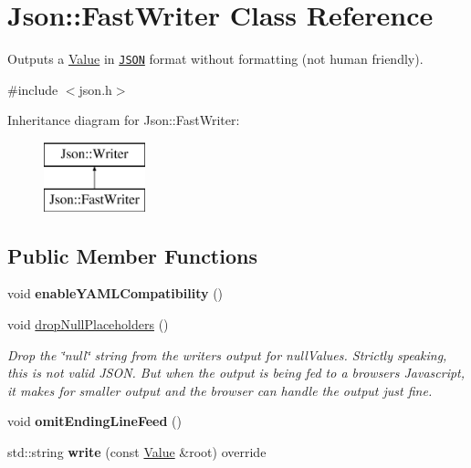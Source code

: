 \hypertarget{class_json_1_1_fast_writer}{}\section{Json\+:\+:Fast\+Writer Class Reference}
\label{class_json_1_1_fast_writer}


Outputs a \hyperlink{class_json_1_1_value}{Value} in \href{http://www.json.org}{\tt J\+S\+O\+N} format without formatting (not human friendly).  




{\ttfamily \#include $<$json.\+h$>$}

Inheritance diagram for Json\+:\+:Fast\+Writer\+:\begin{figure}[H]
\begin{center}
\leavevmode
\includegraphics[height=2.000000cm]{class_json_1_1_fast_writer}
\end{center}
\end{figure}
\subsection*{Public Member Functions}
\begin{DoxyCompactItemize}
\item 
\hypertarget{class_json_1_1_fast_writer_a78d98e9f76d33660ad6e6a1abe287d45}{}void {\bfseries enable\+Y\+A\+M\+L\+Compatibility} ()\label{class_json_1_1_fast_writer_a78d98e9f76d33660ad6e6a1abe287d45}

\item 
\hypertarget{class_json_1_1_fast_writer_a6e93d8dce951e408517311026a065b40}{}void \hyperlink{class_json_1_1_fast_writer_a6e93d8dce951e408517311026a065b40}{drop\+Null\+Placeholders} ()\label{class_json_1_1_fast_writer_a6e93d8dce951e408517311026a065b40}

\begin{DoxyCompactList}\small\item\em Drop the \char`\"{}null\char`\"{} string from the writer\textquotesingle{}s output for null\+Values. Strictly speaking, this is not valid J\+S\+O\+N. But when the output is being fed to a browser\textquotesingle{}s Javascript, it makes for smaller output and the browser can handle the output just fine. \end{DoxyCompactList}\item 
\hypertarget{class_json_1_1_fast_writer_af4ee077d365d75941fb2688d97207a55}{}void {\bfseries omit\+Ending\+Line\+Feed} ()\label{class_json_1_1_fast_writer_af4ee077d365d75941fb2688d97207a55}

\item 
\hypertarget{class_json_1_1_fast_writer_aee69e3f778982ec9218c1a5a7c6a3e7a}{}std\+::string {\bfseries write} (const \hyperlink{class_json_1_1_value}{Value} \&root) override\label{class_json_1_1_fast_writer_aee69e3f778982ec9218c1a5a7c6a3e7a}

\end{DoxyCompactItemize}


